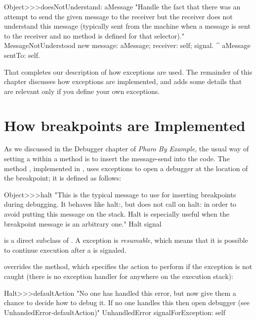 \documentclass[a4paper,10pt,twoside]{book}
\begin{document}
\begin{code}{}
Object>>>doesNotUnderstand: aMessage 
	 "Handle the fact that there was an attempt to send the given message to the receiver but the receiver does not understand this message (typically sent from the machine when a message is sent to the receiver and no method is defined for that selector)."
	MessageNotUnderstood new 
		message: aMessage;
		receiver: self;
		signal.
	^ aMessage sentTo: self.
\end{code}

That completes our description of how exceptions are used.  The remainder of this chapter discusses how exceptions are implemented, and adds some details that are relevant only if you define your own exceptions.



\section{How breakpoints are Implemented}

As we discussed in the Debugger chapter of \emph{Pharo By Example}, 
the usual way of setting a  within a \st{} method is to insert the message-send  into the code. The method , implemented in , uses exceptions to open a debugger at the location of the breakpoint; it is defined as follows:

\begin{code}{}
Object>>>halt
	"This is the typical message to use for inserting breakpoints during 
	debugging. It behaves like halt:, but does not call on halt: in order to 
	avoid putting this message on the stack. Halt is especially useful when 
	the breakpoint message is an arbitrary one."
	Halt signal
\end{code}

 is a direct subclass of . A  exception is \emph{resumable}, which means that it is possible to continue execution after a  is signaled. 

 overrides the  method, which specifies the action to perform if the exception is not caught (\ie there is no exception handler for  anywhere on the execution stack):

\begin{code}{}
Halt>>>defaultAction
	"No one has handled this error, but now give them a chance to decide
	how to debug it.  If no one handles this then open debugger
	(see UnhandedError-defaultAction)"
	UnhandledError signalForException: self
\end{code}
\end{document}
